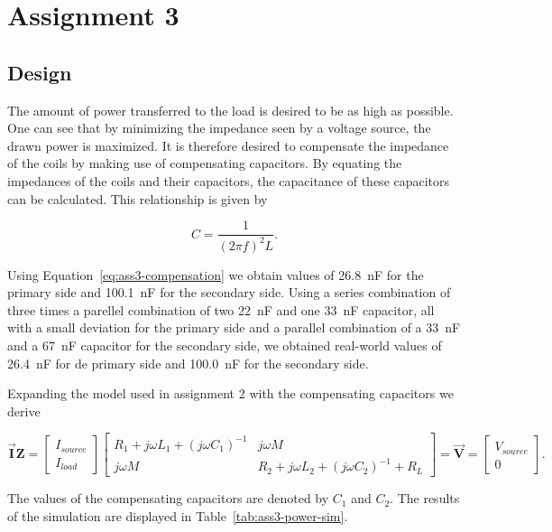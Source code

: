 \documentclass[11pt,titlepage]{report}
\begin{document}
\chapter{Assignment 3}
\section{Design}
The amount of power transferred to the load is desired to be as high as possible. One can see that by minimizing the impedance seen by a voltage source, the drawn power is maximized. It is therefore desired to compensate the impedance of the coils by making use of compensating capacitors. By equating the impedances of the coils and their capacitors, the capacitance of these capacitors can be calculated. This relationship is given by

\begin{equation}
\label{eq:ass3-compensation}
C = \frac{1}{(2 \pi f)^2 L}.
\end{equation}

Using Equation~\ref{eq:ass3-compensation} we obtain values of \SI{26.8}{nF} for the primary side and \SI{100.1}{nF} for the secondary side. Using a series combination of three times a parellel combination of two \SI{22}{nF} and one \SI{33}{nF} capacitor, all with a small deviation for the primary side and a parallel combination of a \SI{33}{nF} and a \SI{67}{nF} capacitor for the secondary side, we obtained real-world values of \SI{26.4}{nF} for de primary side and \SI{100.0}{nF} for the secondary side.

Expanding the model used in assignment 2 with the compensating capacitors we derive

\begin{equation} \label{eq:ass3-model-compensated}
	\mathbf{\vec{I}} \mathbf{Z}=
	\begin{bmatrix}
		I_{source} \\
		I_{load}
	\end{bmatrix}
	\begin{bmatrix}
		R_1 + j \omega L_1 + (j \omega C_1)^{-1}  & j \omega M\\
		j \omega M & R_2 + j \omega L_2 + (j \omega C_2)^{-1}  + R_L
	\end{bmatrix}
	= \mathbf{\vec{V}} =
	\begin{bmatrix}
		V_{source} \\
		0
	\end{bmatrix} .
\end{equation}

The values of the compensating capacitors are denoted by $C_1$ and $C_2$. The results of the simulation are displayed in Table~\ref{tab:ass3-power-sim}.
\end{document}
